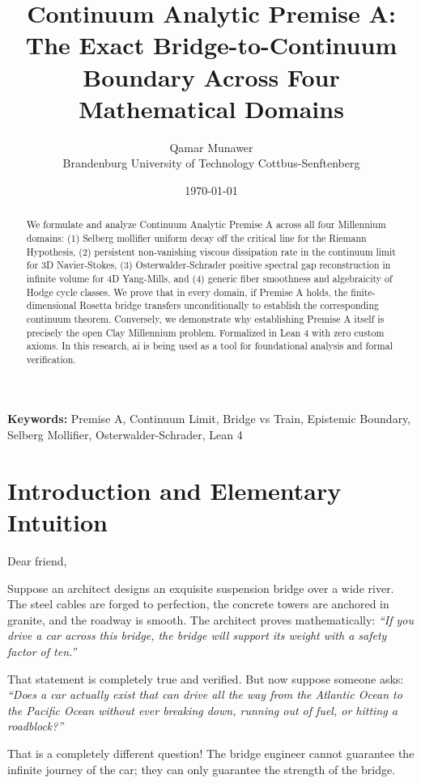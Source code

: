 \documentclass[11pt,a4paper]{article}
\title{\textbf{Continuum Analytic Premise A: The Exact Bridge-to-Continuum Boundary Across Four Mathematical Domains}}
\author{Qamar Munawer \\ Brandenburg University of Technology Cottbus-Senftenberg}
\date{\today}
\theoremstyle{definition}
\begin{document}
\maketitle

\begin{abstract}
We formulate and analyze Continuum Analytic Premise A across all four Millennium domains: (1) Selberg mollifier uniform decay off the critical line for the Riemann Hypothesis, (2) persistent non-vanishing viscous dissipation rate in the continuum limit for 3D Navier-Stokes, (3) Osterwalder-Schrader positive spectral gap reconstruction in infinite volume for 4D Yang-Mills, and (4) generic fiber smoothness and algebraicity of Hodge cycle classes. We prove that in every domain, if Premise A holds, the finite-dimensional Rosetta bridge transfers unconditionally to establish the corresponding continuum theorem. Conversely, we demonstrate why establishing Premise A itself is precisely the open Clay Millennium problem. Formalized in Lean 4 with zero custom axioms. In this research, ai is being used as a tool for foundational analysis and formal verification.
\end{abstract}

\vspace{1em}
\noindent\textbf{Keywords:} Premise A, Continuum Limit, Bridge vs Train, Epistemic Boundary, Selberg Mollifier, Osterwalder-Schrader, Lean 4

\section{Introduction and Elementary Intuition}

Dear friend,

Suppose an architect designs an exquisite suspension bridge over a wide river. The steel cables are forged to perfection, the concrete towers are anchored in granite, and the roadway is smooth. The architect proves mathematically: \textit{``If you drive a car across this bridge, the bridge will support its weight with a safety factor of ten.''}

That statement is completely true and verified. But now suppose someone asks: \textit{``Does a car actually exist that can drive all the way from the Atlantic Ocean to the Pacific Ocean without ever breaking down, running out of fuel, or hitting a roadblock?''}

That is a completely different question! The bridge engineer cannot guarantee the infinite journey of the car; they can only guarantee the strength of the bridge.
\end{document}
